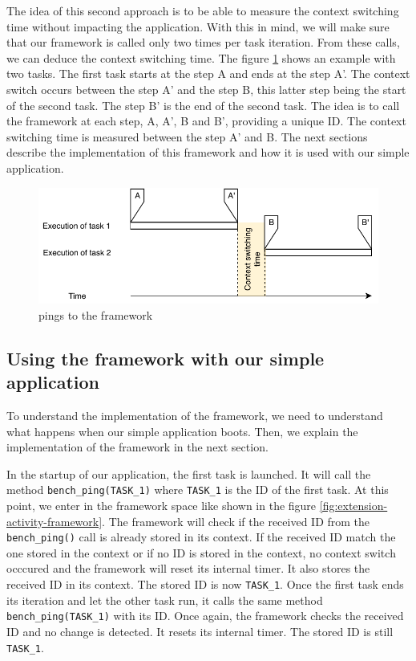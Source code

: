 The idea of this second approach is to be able to measure the context switching time without impacting the application.
With this in mind, we will make sure that our framework is called only two times per task iteration.
From these calls, we can deduce the context switching time.
The figure \ref{fig:internal-framework-ping} shows an example with two tasks.
The first task starts at the step A and ends at the step A'.
The context switch occurs between the step A' and the step B, this latter step being the start of the second task.
The step B' is the end of the second task.
The idea is to call the framework at each step, A, A', B and B', providing a unique ID.
The context switching time is measured between the step A' and B.
The next sections describe the implementation of this framework and how it is used with our simple application.

\begin{figure}[!ht]
  \centering
  \includegraphics[scale=1]{assets/internal-framework-ping.pdf}
  \caption{\label{fig:internal-framework-ping}pings to the framework}
\end{figure}

\subsection{Using the framework with our simple application}

To understand the implementation of the framework, we need to understand what happens when our simple application boots. 
Then, we explain the implementation of the framework in the next section.

In the startup of our application, the first task is launched.
It will call the method \texttt{bench\_ping(TASK\_1)} where \texttt{TASK\_1} is the ID of the first task.
At this point, we enter in the framework space like shown in the figure \ref{fig:extension-activity-framework}.
The framework will check if the received ID from the \texttt{bench\_ping()} call is already stored in its context.
If the received ID match the one stored in the context or if no ID is stored in the context, no context switch occcured and the framework will reset its internal timer.
It also stores the received ID in its context.
The stored ID is now \texttt{TASK\_1}.
Once the first task ends its iteration and let the other task run, it calls the same method \texttt{bench\_ping(TASK\_1)} with its ID.
Once again, the framework checks the received ID and no change is detected.
It resets its internal timer.
The stored ID is still \texttt{TASK\_1}.


